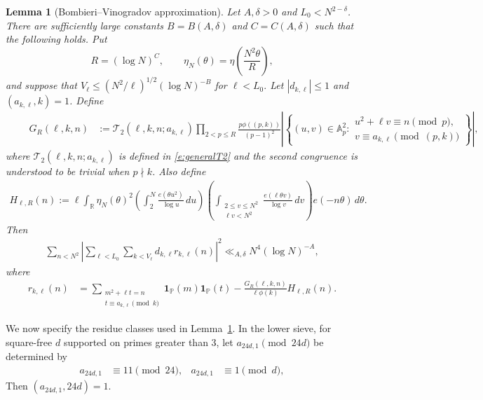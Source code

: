 \documentclass[12pt,reqno]{amsart}
\numberwithin{equation}{section}
\newtheorem{lemma}[equation]{Lemma}
\theoremstyle{definition}
\theoremstyle{remark}
\newcommand{\one}{\mathbf{1}}
\begin{document}
\begin{lemma}[Bombieri--Vinogradov approximation]
\label{l:circmethod}
Let \(A,\delta>0\) and \(L_0<N^{2-\delta}\).  There are sufficiently
large constants \(B=B(A,\delta)\) and \(C=C(A,\delta)\) such that the
following holds.  Put
\[
 R=(\log N)^C,\qquad
 \eta_N(\theta)=\eta\left(\frac{N^2\theta}{R}\right),
\]
and suppose that $V_\ell\leq (N^2/\ell)^{1/2}(\log N)^{-B}$ for $\ell<L_0.$
Let \(|d_{k,\ell}|\leq1\) and
\((a_{k,\ell},k)=1\).
Define 
\begin{align}\quad \quad\label{e:defGR9}
 G_R(\ell,k,n)
 &:=
 \mathcal T_2(\ell,k,n;a_{k,\ell})
 \prod_{2<p\leq R}
 \frac{p\phi((p,k))}{(p-1)^2}
 \left|\left\{(u,v)\in\mathbb A_p^2:
 \begin{array}{l}
  u^2+\ell v\equiv n\pmod p,\\
  v\equiv a_{k,\ell}\pmod{(p,k)}
 \end{array}\right\}\right|,
\end{align}
where $ \mathcal T_2(\ell,k,n;a_{k,\ell}) $ is defined in \eqref{e:generalT2} and the second congruence is understood to be trivial when \(p\nmid k\).
Also define
\begin{align}\label{e:defHR9}
 H_{\ell,R}(n)
 :=
 \ell\int_{\mathbb R}\eta_N(\theta)^2
 \left(\int_2^N\frac{e(\theta u^2)}{\log u}\,du\right)
 \left(\int_{\substack{2\leq v\leq N^2\\\ell v<N^2}}
 \frac{e(\ell\theta v)}{\log v}\,dv\right)
 e(-n\theta)\,d\theta.
\end{align}
Then
\begin{align}\label{e:circmethod}
 \sum_{n<N^2}\left|
 \sum_{\ell<L_0}\sum_{k<V_\ell}
 d_{k,\ell}r_{k,\ell}(n)\right|^2
 \ll_{A,\delta}N^4(\log N)^{-A},
\end{align}
where
\begin{align}\label{e:unweightedremainder}
 r_{k,\ell}(n)
 &=
 \sum_{\substack{m^2+\ell t=n\\
 t\equiv a_{k,\ell}\pmod k}}
 \one_{\mathbb P}(m)\one_{\mathbb P}(t)
 -
 \frac{G_R(\ell,k,n)}{\ell\phi(k)}H_{\ell,R}(n).
\end{align}
\end{lemma}
We now specify the residue classes used in
Lemma~\ref{l:circmethod}.  In the lower sieve, for square-free \(d\)
supported on primes greater than \(3\), let
\(a_{24d,1}\pmod{24d}\) be determined by
\begin{align}\label{e:lowerresidue9}
 a_{24d,1}&\equiv11\pmod{24},
 &a_{24d,1}&\equiv1\pmod d,
\end{align}
Then \((a_{24d,1},24d)=1\).
\end{document}
